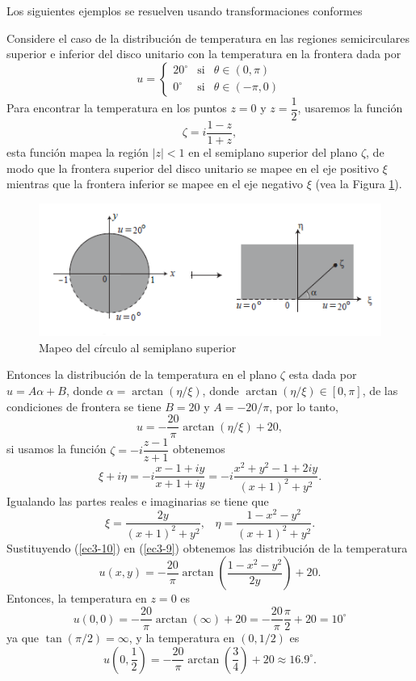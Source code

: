 Los siguientes ejemplos se resuelven usando transformaciones conformes 
\begin{Ejem}
	Considere el caso de la distribución de temperatura en las regiones semicirculares superior e inferior del disco unitario con la temperatura en la frontera dada por
	\[
	u=\left\{
	\begin{array}{ccc}
		20^{\circ}&\mbox{si}& \theta\in(0,\pi)\\
		0^{\circ}&\mbox{si}&\theta\in (-\pi,0)
	\end{array}
	\right.
	\]
	Para encontrar la temperatura en los puntos $z=0$ y $z=\dfrac{1}{2}$, usaremos la función $$\zeta=i\dfrac{1-z}{1+z},$$ esta función mapea la región $|z|<1$ en el semiplano superior del plano $\zeta$, de modo que la frontera superior del disco unitario se mapee en el eje positivo $\xi$ mientras que la frontera inferior se mapee en  el eje negativo $\xi$ (vea la Figura \ref{fig:40}).
	\begin{figure}
		\centering
		\includegraphics[width=0.7\linewidth]{img/40}
		\caption{Mapeo del círculo al semiplano superior}
		\label{fig:40}
	\end{figure}
	Entonces la distribución de la temperatura en el plano $\zeta$ esta dada por $u=A\alpha+B$, donde $\alpha=\arctan(\eta/\xi)$, donde $\arctan(\eta/\xi) \in [0,\pi]$, de las condiciones de frontera se tiene $B=20$ y $A=-20/\pi$, por lo tanto,
	\begin{equation}\label{ec3-9}
		u=-\dfrac{20}{\pi}\arctan(\eta/\xi)+20,
	\end{equation}
	si usamos la función $\zeta=-i\dfrac{z-1}{z+1}$ obtenemos 
	$$\xi+i\eta=-i\dfrac{x-1+iy}{x+1+iy}=-i\dfrac{x^2+y^2-1+2iy}{(x+1)^2+y^2}.$$
	Igualando las partes reales e imaginarias se tiene que 
	\begin{equation}\label{ec3-10}
		\xi=\dfrac{2y}{(x+1)^2+y^2},\;\;\;\eta=\dfrac{1-x^2-y^2}{(x+1)^{2}+y^2}.
	\end{equation}
	Sustituyendo (\ref{ec3-10}) en (\ref{ec3-9}) obtenemos las distribución de la temperatura
	\begin{equation}\label{ec3-11}
		u(x,y)=-\dfrac{20}{\pi}\arctan\left(\dfrac{1-x^2-y^2}{2y}\right)+20.
	\end{equation}
	Entonces, la temperatura en $z=0$ es 
	$$u(0,0)=-\dfrac{20}{\pi}\arctan(\infty)+20=-\dfrac{20}{\pi}\dfrac{\pi}{2}+20=10^{\circ}$$
	ya que $\tan(\pi/2)=\infty$, y la temperatura en $(0,1/2)$ es
	$$u\left(0,\dfrac{1}{2}\right)=-\dfrac{20}{\pi}\arctan\left(\dfrac{3}{4}\right)+20\approx16.9^{\circ}.$$\endproof
\end{Ejem}

